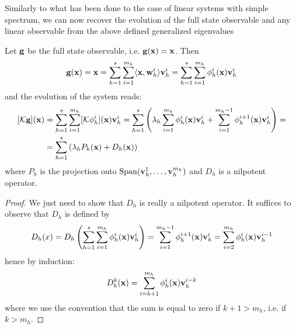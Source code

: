 Similarly to what has been done to the case of linear systems with simple spectrum, we can now recover the evolution of the full state observable and any linear observable from the above defined generalized eigenvalues
\begin{prop}
\label{prop_decomposition_jordan}
Let $\vb{g}$ be the full state observable, i.e. $\vb{g}(\vb{x}) = \vb{x}$. Then
\begin{equation*}
    \vb{g}(\vb{x}) = \vb{x} = \sum_{h = 1}^{s}\sum_{i = 1}^{m_h}\langle \vb{x}, \vb{w}_h^i\rangle\vb{v}_h^i = \sum_{h = 1}^{s}\sum_{i = 1}^{m_h} \phi_h^i(\vb{x}) \vb{v}_h^i
\end{equation*}
and the evolution of the system reads:
\begin{equation}
\begin{split}
    [\mathcal{K}\vb{g}](\vb{x}) &= \sum_{h = 1}^{s}\sum_{i = 1}^{m_h} [\mathcal{K}\phi_h^i](\vb{x}) \vb{v}_h^i = \sum_{h = 1}^{s} \left(\lambda_h\sum_{i = 1}^{m_h} \phi_h^i(\vb{x})\vb{v}_h^i + \sum_{i = 1}^{m_h-1}\phi_h^{i+1}(\vb{x})\vb{v}_h^i \right) =\\
    &= \sum_{h = 1}^{s} \left(\lambda_h P_h(\vb{x}) + D_h(\vb{x}) \right)
\end{split}
\end{equation}
where $P_h$ is the projection onto $\mathrm{Span}(\vb{v}_h^1,\dots,\vb{v}_h^{m_h})$ and $D_h$ is a nilpotent operator.
\end{prop}
\begin{proof}
We just need to show that $D_h$ is really a nilpotent operator. It suffices to observe that $D_h$ is defined by
\begin{equation}
    D_h(x) = D_h\left(\sum_{h = 1}^{s}\sum_{i = 1}^{m_h} \phi_h^i(\vb{x}) \vb{v}_h^i\right) = \sum_{i = 1}^{m_h-1}\phi_h^{i+1}(\vb{x})\vb{v}_h^i = \sum_{i = 2}^{m_h}\phi_h^{i}(\vb{x})\vb{v}_h^{i-1}
\end{equation}
hence by induction:
\begin{equation}
    D_h^k(\vb{x}) = \sum_{i = k+1}^{m_h}\phi_h^{i}(\vb{x})\vb{v}_h^{i-k}
\end{equation}
where we use the convention that the sum is equal to zero if $k+1>m_h$, i.e. if $k > m_h$.
\end{proof}

